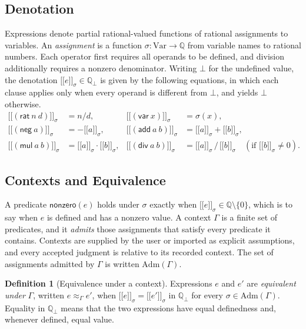 \documentclass[11pt,a4paper]{article}
\theoremstyle{plain}
\theoremstyle{definition}
\newtheorem{definition}[theorem]{Definition}
\theoremstyle{remark}
\theoremstyle{definition}
\newcommand{\Q}{\mathbb{Q}}
\newcommand{\Qb}{\mathbb{Q}_{\bot}}
\newcommand{\nodef}{\bot}
\newcommand{\den}[2]{\mathopen{[\![}#1\mathclose{]\!]}_{#2}}
\newcommand{\eqv}[1]{\approx_{#1}}
\newcommand{\nz}{\mathsf{nonzero}}
\newcommand{\Var}{\mathrm{Var}}
\begin{document}
\subsection{Denotation}

Expressions denote partial rational-valued functions of rational assignments to variables. An \emph{assignment} is a function $\sigma \colon \Var \to \Q$ from variable names to rational numbers. Each operator first requires all operands to be defined, and division additionally requires a nonzero denominator. Writing $\nodef$ for the undefined value, the denotation $\den{e}{\sigma} \in \Qb$ is given by the following equations, in which each clause applies only when every operand is different from $\nodef$, and yields $\nodef$ otherwise.
\begin{align*}
\den{(\mathsf{rat}\ n\ d)}{\sigma} &= n/d, & \den{(\mathsf{var}\ x)}{\sigma} &= \sigma(x),\\
\den{(\mathsf{neg}\ a)}{\sigma} &= -\den{a}{\sigma}, & \den{(\mathsf{add}\ a\ b)}{\sigma} &= \den{a}{\sigma} + \den{b}{\sigma},\\
\den{(\mathsf{mul}\ a\ b)}{\sigma} &= \den{a}{\sigma} \cdot \den{b}{\sigma}, & \den{(\mathsf{div}\ a\ b)}{\sigma} &= \den{a}{\sigma} \,/\, \den{b}{\sigma} \quad (\text{if } \den{b}{\sigma} \ne 0).
\end{align*}

\subsection{Contexts and Equivalence}

A predicate $\nz(e)$ holds under $\sigma$ exactly when $\den{e}{\sigma} \in \Q \setminus \{0\}$, which is to say when $e$ is defined and has a nonzero value. A context $\Gamma$ is a finite set of predicates, and it \emph{admits} those assignments that satisfy every predicate it contains. Contexts are supplied by the user or imported as explicit assumptions, and every accepted judgment is relative to its recorded context. The set of assignments admitted by $\Gamma$ is written $\mathrm{Adm}(\Gamma)$.

\begin{definition}[Equivalence under a context]
Expressions $e$ and $e'$ are \emph{equivalent under} $\Gamma$, written $e \eqv{\Gamma} e'$, when $\den{e}{\sigma} = \den{e'}{\sigma}$ in $\Qb$ for every $\sigma \in \mathrm{Adm}(\Gamma)$. Equality in $\Qb$ means that the two expressions have equal definedness and, whenever defined, equal value.
\end{definition}
\end{document}
